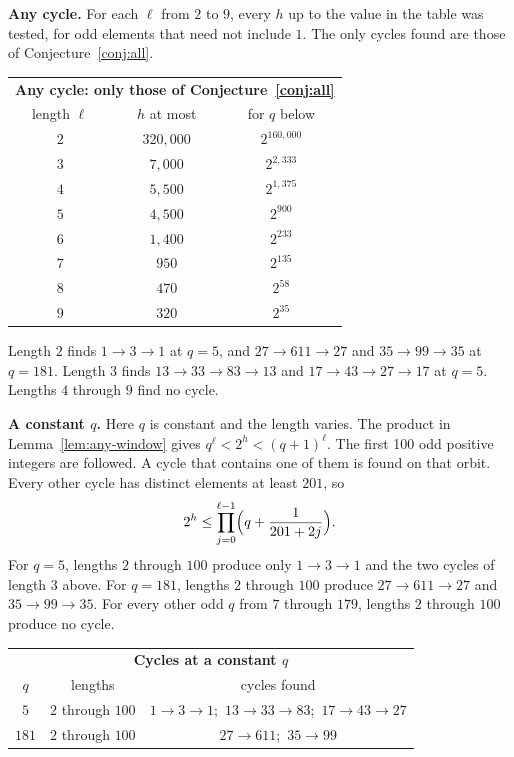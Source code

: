 \documentclass[11pt]{article}
\newcommand{\topic}[1]{\par\noindent\textbf{#1}}
\begin{document}
\topic{Any cycle.}
For each $\ell$ from $2$ to $9$, every $h$ up to the value in the table was tested, for odd elements that need not include $1$.
The only cycles found are those of Conjecture~\ref{conj:all}.
\begin{center}
\begin{tabular}{ccc}
\multicolumn{3}{c}{\textbf{Any cycle: only those of Conjecture~\ref{conj:all}}} \\[0.4em]
length $\ell$ & $h$ at most & for $q$ below \\
$2$ & $320{,}000$ & $2^{160{,}000}$ \\
$3$ & $7{,}000$ & $2^{2{,}333}$ \\
$4$ & $5{,}500$ & $2^{1{,}375}$ \\
$5$ & $4{,}500$ & $2^{900}$ \\
$6$ & $1{,}400$ & $2^{233}$ \\
$7$ & $950$ & $2^{135}$ \\
$8$ & $470$ & $2^{58}$ \\
$9$ & $320$ & $2^{35}$ \\
\end{tabular}
\end{center}
Length $2$ finds $1 \to 3 \to 1$ at $q = 5$, and $27 \to 611 \to 27$ and $35 \to 99 \to 35$ at $q = 181$.
Length $3$ finds $13 \to 33 \to 83 \to 13$ and $17 \to 43 \to 27 \to 17$ at $q = 5$.
Lengths $4$ through $9$ find no cycle.

\topic{A constant $q$.}
Here $q$ is constant and the length varies.
The product in Lemma~\ref{lem:any-window} gives $q^\ell < 2^h < (q+1)^\ell$.
The first 100 odd positive integers are followed.
A cycle that contains one of them is found on that orbit.
Every other cycle has distinct elements at least $201$, so
\[
2^h \le \prod_{j=0}^{\ell-1}\Bigl(q + \frac{1}{201+2j}\Bigr).
\]
For $q = 5$, lengths $2$ through $100$ produce only $1 \to 3 \to 1$ and the two cycles of length $3$ above.
For $q = 181$, lengths $2$ through $100$ produce $27 \to 611 \to 27$ and $35 \to 99 \to 35$.
For every other odd $q$ from $7$ through $179$, lengths $2$ through $100$ produce no cycle.
\begin{center}
\begin{tabular}{ccc}
\multicolumn{3}{c}{\textbf{Cycles at a constant $q$}} \\[0.4em]
$q$ & lengths & cycles found \\
$5$ & $2$ through $100$ & $1 \to 3 \to 1$;\ $13 \to 33 \to 83$;\ $17 \to 43 \to 27$ \\
$181$ & $2$ through $100$ & $27 \to 611$;\ $35 \to 99$ \\
\end{tabular}
\end{center}
\end{document}
